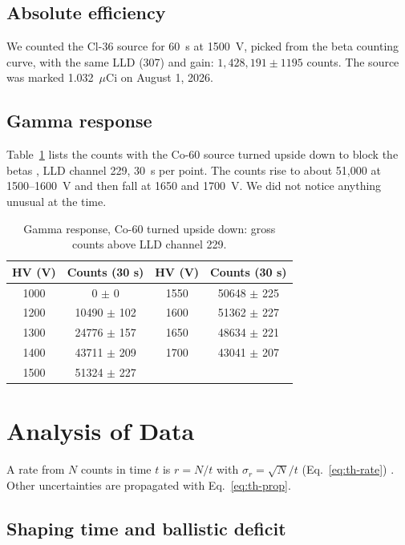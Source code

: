 \documentclass[12pt]{article}
\begin{document}
\subsection{Absolute efficiency}

We counted the Cl-36 source for 60~s at 1500~V, picked from the beta counting curve, with the same LLD (307) and gain: $1{,}428{,}191 \pm 1195$ counts. The source was marked 1.032~$\mu$Ci on August 1, 2026.

\subsection{Gamma response}

Table~\ref{tab:rawgamma} lists the counts with the Co-60 source turned upside down to block the betas \cite{labmanual}, LLD channel 229, 30~s per point. The counts rise to about 51,000 at 1500--1600~V and then fall at 1650 and 1700~V. We did not notice anything unusual at the time.

\begin{table}[!htbp]
\centering\small
\begin{tabular}{cc|cc}
\toprule
\textbf{HV (V)} & \textbf{Counts (30 s)} & \textbf{HV (V)} & \textbf{Counts (30 s)} \\
\midrule
1000 & 0 $\pm$ 0 & 1550 & 50648 $\pm$ 225 \\
1200 & 10490 $\pm$ 102 & 1600 & 51362 $\pm$ 227 \\
1300 & 24776 $\pm$ 157 & 1650 & 48634 $\pm$ 221 \\
1400 & 43711 $\pm$ 209 & 1700 & 43041 $\pm$ 207 \\
1500 & 51324 $\pm$ 227 & & \\
\bottomrule
\end{tabular}
\caption{Gamma response, Co-60 turned upside down: gross counts above LLD channel 229.}
\label{tab:rawgamma}
\end{table}

\section{Analysis of Data}
\label{sec:analysis}

A rate from $N$ counts in time $t$ is $r = N/t$ with $\sigma_r = \sqrt{N}/t$ (Eq.~\ref{eq:th-rate}) \cite{knoll}. Other uncertainties are propagated with Eq.~\ref{eq:th-prop}.

\subsection{Shaping time and ballistic deficit}
\end{document}
